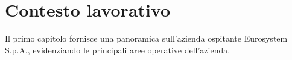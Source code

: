 \chapter{Contesto lavorativo}
Il primo capitolo fornisce una panoramica sull'azienda ospitante Eurosystem S.p.A., evidenziando le principali aree operative dell'azienda. 







